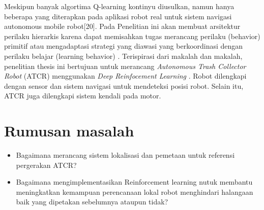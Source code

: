  Meskipun banyak algortima Q-learning kontinyu diusulkan, namun hanya beberapa yang diterapkan pada aplikasi robot real untuk sistem navigasi autonomous mobile robot[20]. Pada Penelitian ini akan membuat arsitektur perilaku hierarkis karena dapat memisahkan tugas merancang perilaku (behavior) primitif atau mengadaptasi strategi yang diawasi yang berkoordinasi dengan perilaku belajar (learning behavior)  \cite{Hoffmann2003}. Terispirasi dari makalah \cite{Bai2018} dan makalah\cite{Kong2009,Michael2008,Wang2008,Arai2019}, penelitian thesis ini bertujuan untuk merancang \textit{Autonomous Trash Collector Robot} (ATCR) menggunakan \textit{Deep Reinfocement Learning}  \cite{Mustafa2019}. Robot dilengkapi dengan sensor  dan sistem navigasi untuk mendeteksi posisi robot. Selain itu, ATCR juga dilengkapi sistem kendali pada motor\cite{Saputra2019}.







\section{Rumusan masalah}
\begin{itemize}
	\item Bagaimana merancang sistem lokalisasi dan pemetaan untuk referensi pergerakan ATCR?
	\item Bagaimana mengimplementasikan Reinforcement learning  nutuk membantu meningkatkan kemampuan perencanaan lokal robot menghindari halangaan baik yang dipetakan sebelumnya ataupun tidak?
\end{itemize} 


